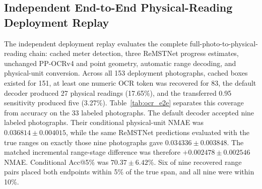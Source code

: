\documentclass[electronics,article,submit,oneauthor]{Definitions/mdpi}
\begin{document}
\subsection{Independent End-to-End Physical-Reading Deployment Replay}
\label{subsec:ocr_e2e_results}

The independent deployment replay evaluates the complete full-photo-to-physical-reading chain: cached meter detection, three ReMSTNet progress estimates, unchanged PP-OCRv4 and point geometry, automatic range decoding, and physical-unit conversion. Across all 153 deployment photographs, cached boxes existed for 151, at least one numeric OCR token was recovered for 83, the default decoder produced 27 physical readings (17.65\%), and the transferred 0.95 sensitivity produced five (3.27\%). Table~\ref{tab:ocr_e2e} separates this coverage from accuracy on the 33 labeled photographs. The default decoder accepted nine labeled photographs. Their conditional physical-unit NMAE was $0.036814\pm0.004015$, while the same ReMSTNet predictions evaluated with the true ranges on exactly those nine photographs gave $0.034336\pm0.003848$. The matched incremental range-stage difference was therefore $+0.002478\pm0.002546$ NMAE. Conditional Acc@5\% was $70.37\pm6.42$\%. Six of nine recovered range pairs placed both endpoints within 5\% of the true span, and all nine were within 10\%.

\begin{table}[H]
\caption{End-to-end physical-reading results with existing OCR. Mean $\pm$ sample SD is across the three ReMSTNet fits. Conditional and matched-oracle columns use the identical accepted photographs within each row. Full-denominator NMAE assigns error 1 to a missing output on any of the 33 labeled photographs.}
\label{tab:ocr_e2e}
\centering
{}
\end{table}
\end{document}
